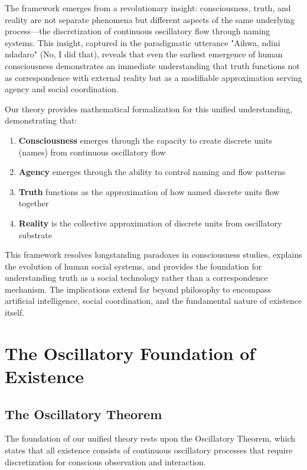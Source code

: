 \documentclass[12pt]{article}
\begin{document}
The framework emerges from a revolutionary insight: consciousness, truth, and reality are not separate phenomena but different aspects of the same underlying process—the discretization of continuous oscillatory flow through naming systems. This insight, captured in the paradigmatic utterance "Aihwa, ndini ndadaro" (No, I did that), reveals that even the earliest emergence of human consciousness demonstrates an immediate understanding that truth functions not as correspondence with external reality but as a modifiable approximation serving agency and social coordination.

Our theory provides mathematical formalization for this unified understanding, demonstrating that:

\begin{enumerate}
\item \textbf{Consciousness} emerges through the capacity to create discrete units (names) from continuous oscillatory flow
\item \textbf{Agency} emerges through the ability to control naming and flow patterns
\item \textbf{Truth} functions as the approximation of how named discrete units flow together
\item \textbf{Reality} is the collective approximation of discrete units from oscillatory substrate
\end{enumerate}

This framework resolves longstanding paradoxes in consciousness studies, explains the evolution of human social systems, and provides the foundation for understanding truth as a social technology rather than a correspondence mechanism. The implications extend far beyond philosophy to encompass artificial intelligence, social coordination, and the fundamental nature of existence itself.

\section{The Oscillatory Foundation of Existence}

\subsection{The Oscillatory Theorem}

The foundation of our unified theory rests upon the Oscillatory Theorem, which states that all existence consists of continuous oscillatory processes that require discretization for conscious observation and interaction.
\end{document}
